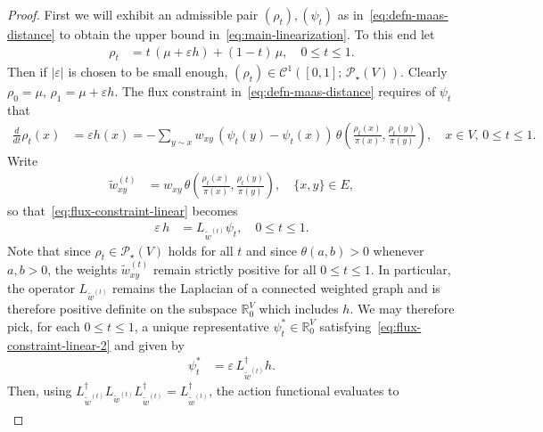 \documentclass[10pt,a4paper]{amsart}
\newcommand{\Prob}{\mathscr{P}}
\begin{document}
\begin{proof}
    First we will exhibit an admissible pair $(\rho_t), (\psi_t)$ as in~\cref{eq:defn-maas-distance} to obtain the upper bound in~\cref{eq:main-linearization}. To this end let
        \begin{align*}
            \rho_t &= t\, (\mu + \varepsilon h) + (1-t) \, \mu,\quad 0\le t\le 1.
        \end{align*}
    Then if $|\varepsilon|$ is chosen to be small enough, $(\rho_t)\in \mathcal{C}^{1}([0, 1];\,\Prob_\star(V))$. Clearly $\rho_0 = \mu,\, \rho_1=\mu + \varepsilon h$. The flux constraint in~\cref{eq:defn-maas-distance} requires of $\psi_t$ that
        \begin{align}\label{eq:flux-constraint-linear}
            \frac{d}{dt} \rho_t(x) &= \varepsilon h(x) = -\sum_{y\sim x} w_{xy}\, (\psi_t(y) - \psi_t(x))\, \theta\left(\frac{\rho_t(x)}{\pi(x)}, \frac{\rho_t(y)}{\pi(y)}\right),\quad x\in V,\, 0\le t\le 1.
        \end{align} 
    Write
        \begin{align*}
            \widetilde{w}^{(t)}_{xy} &= w_{xy}\,\theta\left(\frac{\rho_t(x)}{\pi(x)}, \frac{\rho_t(y)}{\pi(y)}\right),\quad \{x, y\}\in E,
        \end{align*}
    so that~\cref{eq:flux-constraint-linear} becomes
        \begin{align}\label{eq:flux-constraint-linear-2}
            \varepsilon \, h &= L_{\widetilde{w}^{(t)}} \psi_t,\quad 0\le t\le 1.
        \end{align}
    Note that since $\rho_t\in\Prob_\star (V)$ holds for all $t$ and since $\theta(a, b) > 0$ whenever $a, b > 0$, the weights $\widetilde{w}^{(t)}_{xy}$ remain strictly positive for all $0\le t\le 1$. In particular, the operator $L_{\widetilde{w}^{(t)}}$ remains the Laplacian of a connected weighted graph and is therefore positive definite on the subspace $\mathbb{R}^{V}_0$ which includes $h$. We may therefore pick, for each $0\le t\le 1$, a unique representative $\psi_{t}^\ast\in\mathbb{R}^{V}_0$ satisfying~\cref{eq:flux-constraint-linear-2} and given by
        \begin{align*}
            \psi_t^\ast &= \varepsilon \, L_{\widetilde{w}^{(t)}}^{\dagger} h.
        \end{align*}
    Then, using $L_{\widetilde{w}^{(t)}}^{\dagger}L_{\widetilde{w}^{(t)}} L_{\widetilde{w}^{(t)}}^{\dagger} = L_{\widetilde{w}^{(t)}}^{\dagger}$, the action functional evaluates to
        \begin{align}\label{eq:action-upper-bound-1}

\end{align}
\end{proof}
\end{document}

